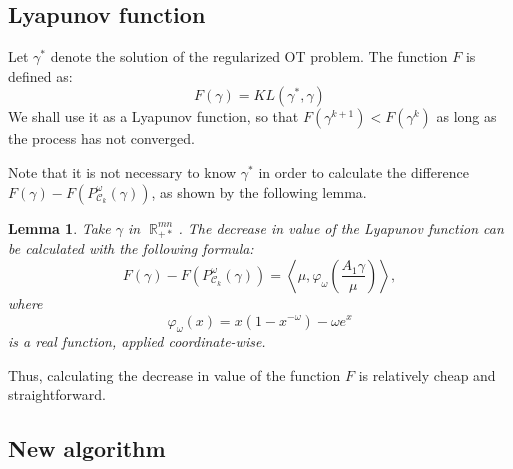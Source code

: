 \documentclass{article} %
\newcommand{\scal}[2]{\left\langle #1 , #2 \right\rangle}
\DeclareMathOperator{\IR}{\mathbb{R}}
\DeclareMathOperator{\Ccal}{\mathcal{C}}
\theoremstyle{plain}
\newtheorem{lemma}{Lemma}
\theoremstyle{definition}
\theoremstyle{remark}
\begin{document}
\subsection{Lyapunov function}
Let $\gamma^*$ denote the solution of the regularized OT problem.
The function $F$ is defined as:
\begin{equation}\label{eq:lyapunov_function}
F(\gamma) = KL(\gamma^*, \gamma)
\end{equation}
We shall use it as a Lyapunov function, so that $F(\gamma^{k+1}) < F(\gamma^k)$ as long as the process has not converged.

Note that it is not necessary to know $\gamma^*$ in order to calculate the difference $F(\gamma) - F(P^\omega_{\Ccal_k}(\gamma))$, as shown by the following lemma.
\begin{lemma}\label{lemma:lyapunov_decrease}
	Take $\gamma$ in $\IR^{mn}_{+*}$. The decrease in value of the Lyapunov function can be calculated with the following formula:
	\begin{equation} \label{eq:kl_diff_scal}
	F(\gamma) - F(P^\omega_{\Ccal_k}(\gamma)) = 
	\scal{\mu}{\varphi_\omega \left(\frac{A_1 \gamma}{\mu}\right)},
	\end{equation}
	where
	\begin{equation}
	\varphi_\omega(x) = x(1-x^{-\omega}) - \omega e^x
	\end{equation}
	is a real function, applied coordinate-wise.
\end{lemma}
Thus, calculating the decrease in value of the function $F$ is relatively cheap and straightforward.

\subsection{New algorithm}
\end{document}
